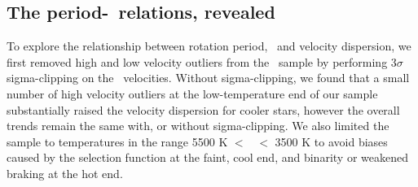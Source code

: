
\subsection{The period-\teff\ relations, revealed}
\label{sec:the_reveal}

To explore the relationship between rotation period, \teff\ and velocity
dispersion, we first removed high and low velocity outliers from the \mct\
sample by performing 3$\sigma$ sigma-clipping on the \vb\ velocities.
Without sigma-clipping, we found that a small number of high velocity
outliers at the low-temperature end of our sample substantially raised the
velocity dispersion for cooler stars, however the overall trends remain the
same with, or without sigma-clipping.
We also limited the sample to temperatures in the range 5500 K $<$ \teff\ $<$
3500 K to avoid biases caused by the selection function at the faint, cool
end, and binarity or weakened braking \citep{vansaders2016} at the hot end.

